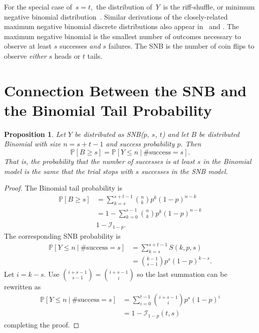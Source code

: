 \documentclass[review]{elsarticle}
\newtheorem{prop}{Proposition}
\begin{document}
For the special case of $\,s=t,$ the distribution of $\,Y\,$ is the
riff-shuffle, or minimum negative binomial distribution~\citep{Uppuluri1970}.
Similar derivations of the closely-related maximum negative binomial 
discrete distributions also appear in~\cite{Zhang2000}
and \cite{Zelterman2005}.
The maximum negative binomial is the smallest number of outcomes necessary to 
observe at least $s$ successes {\em and} $s$ failures. The SNB is the 
number of coin flips to observe {\em either} $s$ heads or $t$ tails.

\section{Connection Between the SNB and the Binomial Tail Probability}

\begin{prop} \label{binomial_tail}
Let $Y$ be distributed as SNB($p$, $s$, $t$) and let 
$B$ be distributed Binomial with size $n=s+t-1$ and success probability
$p$. Then
\begin{equation}
\mathbb{P}[B \geq s] = \mathbb{P} [Y \leq n\ |\ \text{\#success} = s].
\end{equation}
That is, the probability that the number of successes is at least $s$
in the Binomial model is the same that the trial stops with $s$ 
successes in the SNB model.
\end{prop}
\begin{proof}
The Binomial tail probability is
\begin{align*}
\mathbb{P}[B \geq s] &= \sum_{k=s}^{s+t-1} {n \choose k} p^k (1-p)^{n-k} \\
  &= 1 - \sum_{k=0}^{s-1} {n \choose k} p^k (1-p)^{n-k} \\
  & 1 - \mathcal{I}_{1-p}.
\end{align*}
The corresponding SNB probability is
\begin{align*}
\mathbb{P} [Y \leq n\ |\ \text{\#success}=s] &= \sum_{k=s}^{s+t-1} S(k, p, s)\\
 &= {k-1 \choose s-1} p^s (1-p)^{k-s}.
\end{align*}
Let $i=k-s$. Use ${i+s-1 \choose s-1} = {i+s-1 \choose i}$
so the last summation can be rewritten as
\begin{align}
\mathbb{P} [Y \leq n\ |\ \text{\#success} = s] &= \sum_{i=0}^{t-1} 
  {i+s-1 \choose i} p^s (1-p)^i\\
  &= 1 - \mathcal{I}_{1-p}(t, s)
\end{align}
completing the proof.
\end{proof}
\end{document}
